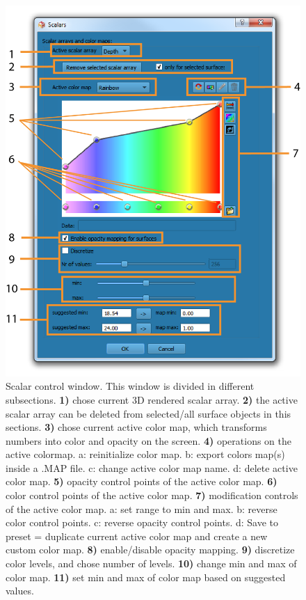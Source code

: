 \begin{figure}
  \centering
  \includegraphics[scale=1]{images/11/scalar_rendering_option_window2.png}
\caption{Scalar control window. This window is divided in different subsections. \textbf{1)} chose current 3D rendered scalar array.  \textbf{2)} the active scalar array can be deleted from selected/all surface objects in this sections. \textbf{3)} chose current active color map, which transforms numbers into color and opacity on the screen. \textbf{4)} operations on the active colormap. a: reinitialize color map. b: export colors map(s) inside a .MAP file. c: change active color map name. d: delete active color map. \textbf{5)} opacity control points of the active color map. \textbf{6)} color control points of the active color map. \textbf{7)} modification controls of the active color map. a: set range to min and max. b: reverse color control points. c: reverse opacity control points. d: Save to preset = duplicate current active color map and create a new custom color map. \textbf{8)} enable/disable opacity mapping. \textbf{9)} discretize color levels, and chose number of levels. \textbf{10)} change min and max of color map. \textbf{11)} set min and max of color map based on suggested values.}	
\label{scalar_rendering_options_window}
 \end{figure}



